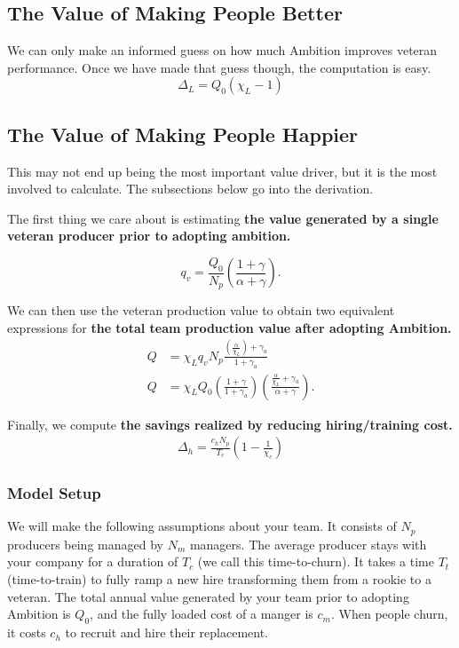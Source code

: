 \documentclass[paper=a4, fontsize=11pt abstract]{scrartcl}
\numberwithin{equation}{section}		%
\numberwithin{figure}{section}			%
\numberwithin{table}{section}				%
\begin{document}
\subsection{The Value of Making People Better}
We can only make an informed guess on how much Ambition improves veteran performance.
Once we have made that guess though, the computation is easy.
\begin{equation}
    \Delta_L = Q_0\left(\chi_L - 1\right)
\end{equation}


\subsection{The Value of Making People Happier}
This may not end up being the most important value driver, but it is the most involved to calculate.
The subsections below go into the derivation.

The first thing we care about is estimating \textbf{the value generated by a single veteran producer prior to adopting ambition.}

\begin{equation}
    q_{v} = \frac{Q_0}{N_p}\left(\frac{1 + \gamma}{\alpha + \gamma}\right).
\end{equation}

We can then use the veteran production value to obtain two equivalent expressions for \textbf{the total team production value after adopting Ambition.}
\begin{align}
    Q &= \chi_L q_{v} N_p\frac{\left(\frac{\alpha}{\chi_L}\right) + \gamma_a}{1 + \gamma_a} \label{Q0} \\
    Q &= \chi_L Q_0  \left(\frac{1+\gamma}{1 + \gamma_a}\right) \left(\frac{\frac{\alpha}{\chi_L} + \gamma_a  }{\alpha + \gamma}\right).
\end{align}

Finally, we compute \textbf{the savings realized by reducing hiring/training cost.}
\begin{align}
    \Delta_h = \frac{c_h N_p}{T_c}\left(1 - \frac{1}{\chi_c}\right)
\end{align}

\subsubsection{Model Setup}
We will make the following assumptions about your team.  It consists of $N_p$ producers being managed by $N_m$ managers.  The average producer stays with your company for a duration of $T_c$ (we call this time-to-churn).  It takes a time $T_t$ (time-to-train) to fully ramp a new hire transforming them from a rookie to a veteran. The total annual value generated by your team prior to adopting Ambition is $Q_0$, and the fully loaded cost of a manger is $c_m$.  When people churn, it costs $c_h$ to recruit and hire their replacement.
\end{document}
